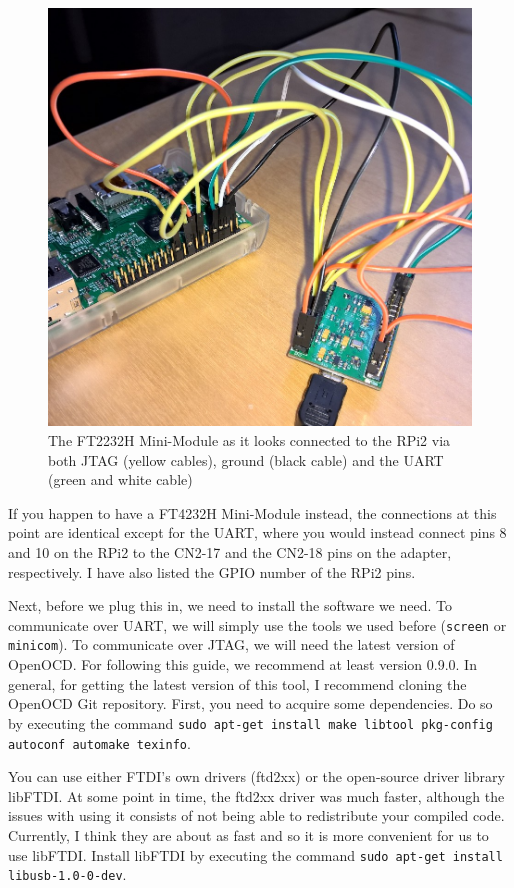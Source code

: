 \documentclass[a4paper,11pt,reqno]{amsart}
\begin{document}
{\begin{figure}[hb]
\begin{center}
   \includegraphics[scale=0.3]{connection2.png}
 \end{center}
 \caption{The FT2232H Mini-Module as it looks connected to the RPi2 via both JTAG (yellow cables), ground (black cable) and the UART (green and white cable)}
 \label{fig:conn2}
\end{figure}

If you happen to have a FT4232H Mini-Module instead, the connections at this point are identical except for the UART, where you would instead connect pins 8 and 10 on the RPi2 to the CN2-17 and the CN2-18 pins on the adapter, respectively. I have also listed the GPIO number of the RPi2 pins.

Next, before we plug this in, we need to install the software we need. To communicate over UART, we will simply use the tools we used before (\texttt{screen} or \texttt{minicom}). To communicate over JTAG, we will need the latest version of OpenOCD. For following this guide, we recommend at least version 0.9.0. In general, for getting the latest version of this tool, I recommend cloning the OpenOCD Git repository. First, you need to acquire some dependencies. Do so by executing the command \texttt{sudo apt-get install make libtool pkg-config autoconf automake texinfo}.

You can use either FTDI's own drivers (ftd2xx) or the open-source driver library libFTDI. At some point in time, the ftd2xx driver was much faster, although the issues with using it consists of not being able to redistribute your compiled code. Currently, I think they are about as fast and so it is more convenient for us to use libFTDI. Install libFTDI by executing the command \texttt{sudo apt-get install libusb-1.0-0-dev}.

}
\end{document}
